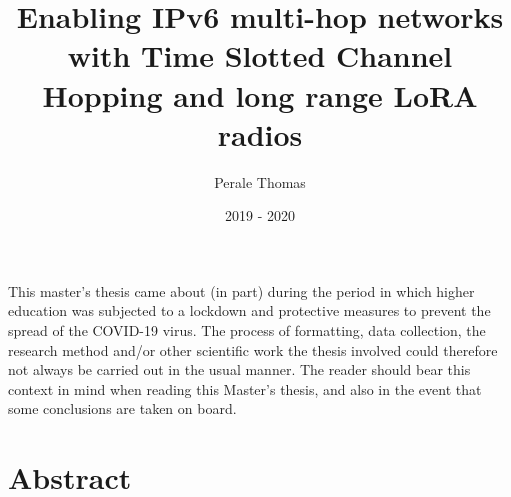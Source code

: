 \documentclass[11pt]{report}
\title{Enabling IPv6 multi-hop networks with Time Slotted Channel Hopping and long range LoRA radios}
\author{Perale Thomas}
\date{2019 - 2020}
\begin{document}
\maketitle



\clearpage
\vspace*{\fill}
\begin{center}
\begin{minipage}{.6\textwidth}
This master's thesis came about (in part) during the period in which higher
education was subjected to  a  lockdown  and  protective  measures  to  prevent
the  spread  of  the  COVID-19  virus.  The  process  of formatting, data
collection, the research method and/or other scientific work the thesis
involved could therefore not always be carried out in the usual manner. The
reader should bear this context in mind when reading this Master's thesis, and
also in the event that some conclusions are taken on board.
\end{minipage}
\end{center}
\vfill %
\clearpage

\newpage

\section*{Abstract}



\end{document}
